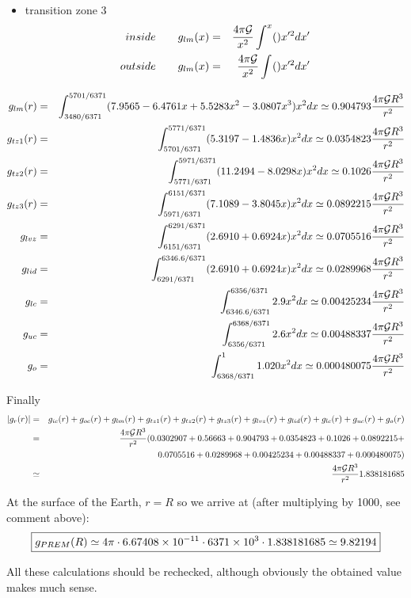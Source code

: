\begin{itemize}
\item transition zone 3 
\begin{eqnarray}
inside \qquad g_{lm}(x)  &=& \frac{4 \pi {\cal G}}{x^2} \int_{}^{x} () x'^2 dx' \nonumber\\ 
outside \qquad g_{lm}(x) &=&  \frac{4 \pi {\cal G}}{x^2} \int_{}^{} () x'^2 dx' \nonumber\\  
\end{eqnarray}


\end{itemize}


\begin{eqnarray}
g_{lm}(r) 
&=& \int_{3480/6371}^{5701/6371} (7.9565-6.4761x+5.5283x^2-3.0807x^3)x^2 dx 
\simeq 0.904793 \frac{4 \pi {\cal G} R^3}{r^2}\nonumber\\
g_{tz1}(r) 
&=& \int_{5701/6371}^{5771/6371} (5.3197-1.4836x)x^2 dx 
\simeq 0.0354823 \frac{4 \pi {\cal G} R^3}{r^2}\nonumber\\
g_{tz2}(r)
&=& \int_{5771/6371}^{5971/6371}   (11.2494-8.0298x)x^2 dx \simeq  0.1026 \frac{4 \pi {\cal G} R^3}{r^2}\nonumber\\
g_{tz3}(r)
&=& \int_{5971/6371}^{6151/6371}   (7.1089-3.8045x)x^2 dx  \simeq 0.0892215 \frac{4 \pi {\cal G} R^3}{r^2}\nonumber\\
g_{lvz} 
&=&  \int_{6151/6371}^{6291/6371} (2.6910+0.6924x) x^2 dx  \simeq  0.0705516 \frac{4 \pi {\cal G} R^3}{r^2}\nonumber\\
g_{lid}
&=& \int_{6291/6371}^{6346.6/6371} (2.6910+0.6924x)x^2 dx \simeq 0.0289968 \frac{4 \pi {\cal G} R^3}{r^2}\nonumber\\
g_{lc}
&=& \int_{6346.6/6371}^{6356/6371} 2.9 x^2 dx  \simeq 0.00425234 \frac{4 \pi {\cal G} R^3}{r^2}\nonumber\\
g_{uc}
&=& \int_{6356/6371}^{6368/6371} 2.6 x^2 dx  \simeq 0.00488337 \frac{4 \pi {\cal G} R^3}{r^2}\nonumber\\
g_{o}
&=& \int_{6368/6371}^{1} 1.020 x^2 dx  \simeq 0.000480075 \frac{4 \pi {\cal G} R^3}{r^2}
\end{eqnarray}


Finally 
\begin{eqnarray}
|g_r(r)| 
&=&  g_{ic}(r) + g_{oc}(r) + g_{lm}(r) + g_{tz1}(r) + g_{tz2}(r) + g_{tz3}(r) + 
g_{lvz}(r) + g_{lid}(r) + g_{lc}(r) + g_{uc}(r) + g_{o}(r) \nonumber\\
&=& 
\frac{4 \pi {\cal G} R^3}{r^2}
(
0.0302907 + 
0.56663 +
0.904793 +
0.0354823 +
0.1026 +
0.0892215+ \nonumber\\
&& 
0.0705516 +
0.0289968 +
0.00425234+
0.00488337+
0.000480075
  ) \nonumber\\
&\simeq& 
\frac{4 \pi {\cal G} R^3}{r^2} \nonumber
1.838181685
\end{eqnarray}

At the surface of the Earth, $r=R$ so we arrive at (after multiplying by 1000, see comment above): 
\[
\boxed{
g_{\tiny PREM}(R) \simeq 
4 \pi \cdot 6.67408\times 10^{-11}\cdot  6371\times 10^3 \cdot 1.838181685
\simeq 9.82194
}
\]

All these calculations should be rechecked, although obviously the obtained value makes much sense. 

